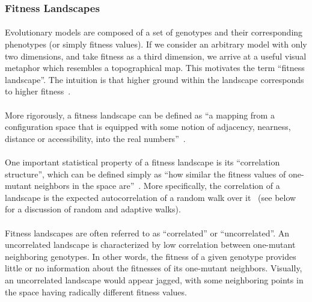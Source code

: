 \documentclass[12pt,letterpaper,titlepage]{article}
\begin{document}

\subsubsection{Fitness Landscapes}

\paragraph{}
Evolutionary models are composed of a set of genotypes and their corresponding
phenotypes (or simply fitness values).  If we consider an arbitrary model with
only two dimensions, and take fitness as a third dimension, we arrive at a
useful visual metaphor which resembles a topographical map. This motivates the
term ``fitness landscape''. The intuition is that higher ground within the
landscape corresponds to higher fitness~\cite{Wright1932}.

\paragraph{}
More rigorously, a fitness landscape can be defined as ``a mapping from a
configuration space that is equipped with some notion of adjacency, nearness,
distance or accessibility, into the real numbers''~\cite{Calcott2008}.

\paragraph{}
One important statistical property of a fitness landscape is its ``correlation
structure'', which can be defined simply as ``how similar the fitness values of
one-mutant neighbors in the space are''~\cite{Kauffman1993}. More specifically,
the correlation of a landscape is the expected autocorrelation of a random walk
over it~\cite{Weinberger1990} (see below for a discussion of random and
adaptive walks).

\paragraph{}
Fitness landscapes are often referred to as ``correlated'' or ``uncorrelated''.
An uncorrelated landscape is characterized by low correlation between
one-mutant neighboring genotypes. In other words, the fitness of a given
genotype provides little or no information about the fitnesses of its
one-mutant neighbors. Visually, an uncorrelated landscape would appear jagged,
with some neighboring points in the space having radically different fitness
values.
\end{document}
